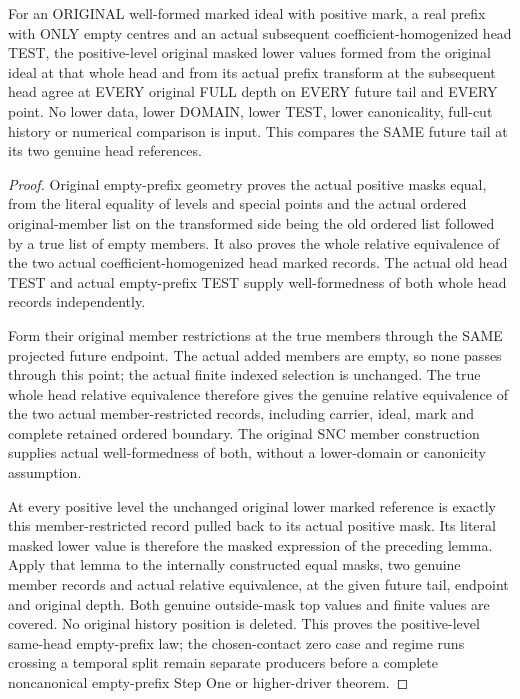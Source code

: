 \begin{theorem}
\label{hir:original-positive-empty-prefix-head-all-lower-values}
\leanok
For an ORIGINAL well-formed marked ideal with positive mark, a real prefix
with ONLY empty centres and an actual subsequent coefficient-homogenized
head TEST, the positive-level original masked lower values formed from
the original ideal at that whole head and from its actual prefix transform
at the subsequent head agree at EVERY original FULL depth on EVERY future
tail and EVERY point. No lower data, lower DOMAIN, lower TEST, lower
canonicality, full-cut history or numerical comparison is input. This
compares the SAME future tail at its two genuine head references.
\end{theorem}
\begin{proof}
Original empty-prefix geometry proves the actual positive masks equal,
from the literal equality of levels and special points and the actual
ordered original-member list on the transformed side being the old
ordered list followed by a true list of empty members. It also proves the
whole relative equivalence of the two actual coefficient-homogenized head
marked records. The actual old head TEST and actual empty-prefix TEST
supply well-formedness of both whole head records independently.

Form their original member restrictions at the true members through the
SAME projected future endpoint. The actual added members are empty, so
none passes through this point; the actual finite indexed selection is
unchanged. The true whole head relative equivalence therefore gives the
genuine relative equivalence of the two actual member-restricted records,
including carrier, ideal, mark and complete retained ordered boundary.
The original SNC member construction supplies actual well-formedness of
both, without a lower-domain or canonicity assumption.

At every positive level the unchanged original lower marked reference is
exactly this member-restricted record pulled back to its actual positive
mask. Its literal masked lower value is therefore the masked expression
of the preceding lemma. Apply that lemma to the internally constructed
equal masks, two genuine member records and actual relative equivalence,
at the given future tail, endpoint and original depth. Both genuine
outside-mask top values and finite values are covered. No original
history position is deleted. This proves the positive-level same-head
empty-prefix law; the chosen-contact zero case and regime runs crossing
a temporal split remain separate producers before a complete noncanonical
empty-prefix Step One or higher-driver theorem.
\end{proof}
